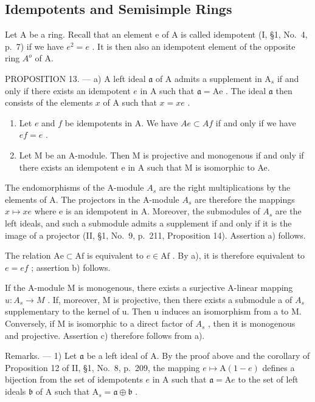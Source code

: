 \subsection{Idempotents and Semisimple Rings}

Let A be a ring. Recall that an element e of A is called idempotent (I, §1, No.~4, p.~7) if we have \(e^{2} = e\) . It is then also an idempotent element of the opposite ring \(A^{o}\) of A.

PROPOSITION 13. --- a) A left ideal \(\mathfrak{a}\) of A admits a supplement in \(\mathrm{A}_s\) if and only if there exists an idempotent \(e\) in A such that \(\mathfrak{a} = \mathrm{Ae}\) . The ideal \(\mathfrak{a}\) then consists of the elements \(x\) of A such that \(x = xe\) .

\begin{enumerate}
\def\labelenumi{\alph{enumi})}
\setcounter{enumi}{1}
\item
  Let \(e\) and \(f\) be idempotents in A. We have \(Ae \subset Af\) if and only if we have \(ef = e\) .
\item
  Let M be an A-module. Then M is projective and monogenous if and only if there exists an idempotent e in A such that M is isomorphic to Ae.
\end{enumerate}

The endomorphisms of the A-module \(A_{s}\) are the right multiplications by the elements of A. The projectors in the A-module \(A_{s}\) are therefore the mappings \(x \mapsto xe\) where e is an idempotent in A. Moreover, the submodules of \(A_{s}\) are the left ideals, and such a submodule admits a supplement if and only if it is the image of a projector (II, §1, No.~9, p.~211, Proposition 14). Assertion a) follows.

The relation \(\mathrm{Ae} \subset \mathrm{Af}\) is equivalent to \(e \in \mathrm{Af}\) . By a), it is therefore equivalent to \(e = ef\) ; assertion b) follows.

If the A-module M is monogenous, there exists a surjective A-linear mapping \(u: A_{s} \to M\) . If, moreover, M is projective, then there exists a submodule a of \(A_{s}\) supplementary to the kernel of u. Then u induces an isomorphism from a to M. Conversely, if M is isomorphic to a direct factor of \(A_{s}\) , then it is monogenous and projective. Assertion c) therefore follows from a).

Remarks. --- 1) Let \(\mathfrak{a}\) be a left ideal of A. By the proof above and the corollary of Proposition 12 of II, §1, No.~8, p.~209, the mapping \(e \mapsto \mathrm{A}(1 - e)\) defines a bijection from the set of idempotents \(e\) in A such that \(\mathfrak{a} = \mathrm{A}e\) to the set of left ideals \(\mathfrak{b}\) of A such that \(\mathrm{A}_s = \mathfrak{a} \oplus \mathfrak{b}\) .

